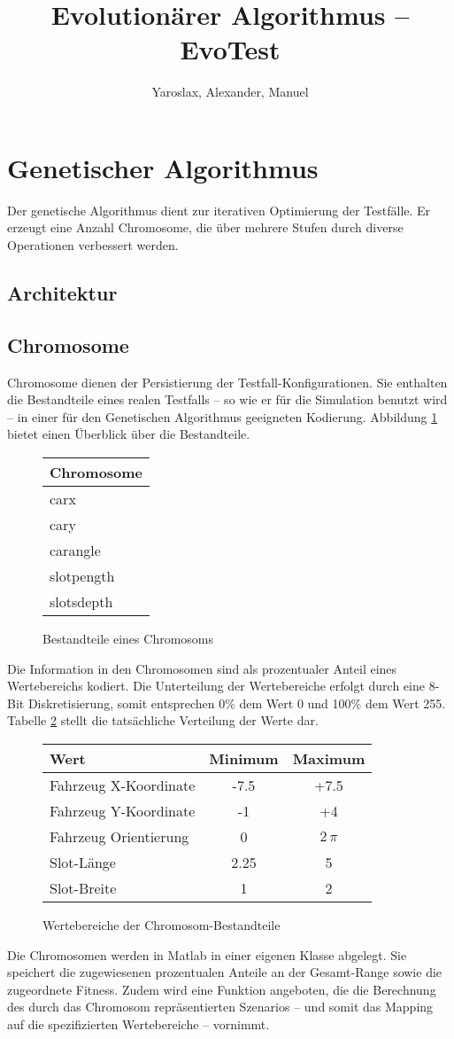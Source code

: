\documentclass[12pt,a4paper]{scrartcl}
\title{Evolutionärer Algorithmus -- EvoTest}
\author{Yaroslax, Alexander, Manuel}
\begin{document}
\section{Genetischer Algorithmus}
Der genetische Algorithmus dient zur iterativen Optimierung der Testfälle. Er erzeugt eine Anzahl Chromosome, die über mehrere Stufen durch diverse Operationen verbessert werden.

\subsection{Architektur}

\subsection{Chromosome}
Chromosome dienen der Persistierung der Testfall-Konfigurationen. Sie enthalten die Bestandteile eines realen Testfalls -- so wie er für die Simulation benutzt wird -- in einer für den Genetischen Algorithmus geeigneten Kodierung. Abbildung \ref{fig:chromosome} bietet einen Überblick über die Bestandteile.
\begin{figure}[hb]
\centering
\begin{tabular}{|l|}
\hline
Chromosome\\
\hline
carx \\
cary\\
carangle\\
slotpength\\
slotsdepth\\
\hline
\end{tabular}
\caption{Bestandteile eines Chromosoms}
\label{fig:chromosome}
\end{figure}
Die Information in den Chromosomen sind als prozentualer Anteil eines Wertebereichs kodiert. Die Unterteilung der Wertebereiche erfolgt durch eine 8-Bit Diskretisierung, somit entsprechen 0\% dem Wert 0 und 100\% dem Wert 255. Tabelle \ref{tab:ranges} stellt die tatsächliche Verteilung der Werte dar. 
\begin{figure}[hb]
\centering
\begin{tabular}{l|c|c}
Wert & Minimum & Maximum \\\hline
Fahrzeug X-Koordinate & -7.5 & +7.5 \\
Fahrzeug Y-Koordinate & -1 & +4 \\
Fahrzeug Orientierung & 0 & $2\,\pi$\\
Slot-Länge & 2.25 & 5 \\
Slot-Breite & 1 & 2 \\
\end{tabular}
\caption{Wertebereiche der Chromosom-Bestandteile}
\label{tab:ranges}
\end{figure}
Die Chromosomen werden in Matlab in einer eigenen Klasse abgelegt. Sie speichert die zugewiesenen prozentualen Anteile an der Gesamt-Range sowie die zugeordnete Fitness. Zudem wird eine Funktion angeboten, die die Berechnung des durch das Chromosom repräsentierten Szenarios -- und somit das Mapping auf die spezifizierten Wertebereiche -- vornimmt.
\end{document}
